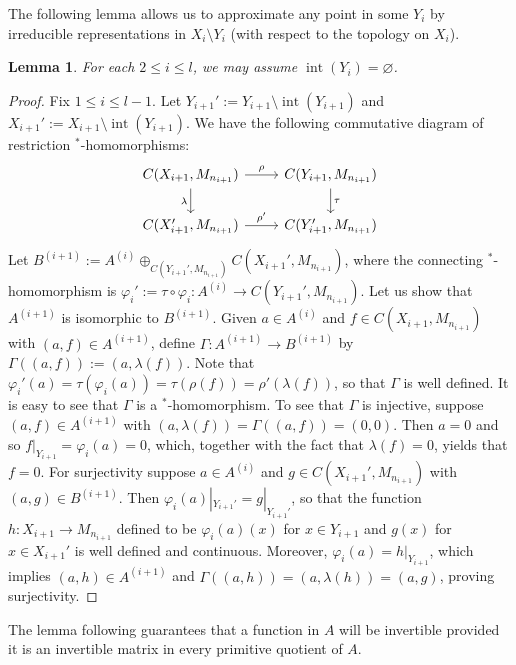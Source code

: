 \documentclass[12pt]{amsart}
\numberwithin{equation}{section}
\newtheorem{lemma}[theorem]{Lemma}
\theoremstyle{definition}
\theoremstyle{remark}
\newcommand{\inte}{\operatorname{int}}
\begin{document}
The following lemma allows us to approximate any point in some $Y_{i}$ by irreducible representations in $X_{i}\setminus Y_{i}$ (with respect to the topology on $X_{i}$). 

\begin{lemma}
	\label{empty interior}
	For each $2\leq i\leq  l$, we may assume $\inte(Y_{i})=\varnothing$.
\end{lemma}

\begin{proof}
	Fix $1\leq i\leq l-1$. Let $Y_{i+1}':=Y_{i+1}\setminus\inte(Y_{i+1})$ and $X_{i+1}':=X_{i+1}\setminus\inte(Y_{i+1})$. We have the following commutative diagram of restriction $^*$-homomorphisms:
	$$
	\begin{tikzcd}
	C(X_{i+1},M_{n_{i+1}}) \arrow{r}{\rho} \arrow[swap]{d}{\lambda} & C(Y_{i+1},M_{n_{i+1}}) \arrow{d}{\tau} \\
	C(X_{i+1}',M_{n_{i+1}}) \arrow{r}{\rho'} & C(Y_{i+1}',M_{n_{i+1}})
	\end{tikzcd}
	$$ 
	Let $B^{(i+1)}:= A^{(i)}\oplus_{C(Y_{i+1}',M_{n_{i+1}})}C(X_{i+1}',M_{n_{i+1}})$, where the connecting $^*$-homomorphism is $\varphi_{i}':=\tau\circ\varphi_{i}\colon A^{(i)}\to C(Y_{i+1}',M_{n_{i+1}})$. Let us show that $A^{(i+1)}$ is isomorphic to $B^{(i+1)}$. Given $a\in A^{(i)}$ and $f\in C(X_{i+1},M_{n_{i+1}})$ with $(a,f)\in A^{(i+1)}$, define $\Gamma\colon A^{(i+1)}\to B^{(i+1)}$ by $\Gamma((a,f)):=(a,\lambda(f))$. Note that $\varphi_{i}'(a)=\tau(\varphi_{i}(a))=\tau(\rho(f))=\rho'(\lambda(f))$, so that $\Gamma$ is well defined. It is easy to see that $\Gamma$ is a $^*$-homomorphism. To see that $\Gamma$ is injective, suppose $(a,f)\in A^{(i+1)}$ with $(a,\lambda(f))=\Gamma((a,f))=(0,0)$. Then $a=0$ and so $f|_{Y_{i+1}}=\varphi_{i}(a)=0$, which, together with the fact that $\lambda(f)=0$, yields that $f=0$. For surjectivity suppose $a\in A^{(i)}$ and $g\in C(X_{i+1}',M_{n_{i+1}})$ with $(a,g)\in B^{(i+1)}$. Then $\varphi_{i}(a)|_{Y_{i+1}'}=g|_{Y_{i+1}'}$, so that the function $h\colon X_{i+1}\to M_{n_{i+1}}$ defined to be $\varphi_{i}(a)(x)$ for $x\in Y_{i+1}$ and $g(x)$ for $x\in X_{i+1}'$ is well defined and continuous. Moreover, $\varphi_{i}(a)=h|_{Y_{i+1}}$, which implies $(a,h)\in A^{(i+1)}$ and $\Gamma((a,h))=(a,\lambda(h))=(a,g)$, proving surjectivity. 
\end{proof}

The lemma following guarantees that a function in $A$ will be invertible provided it is an invertible matrix in every primitive quotient of $A$.
\end{document}
